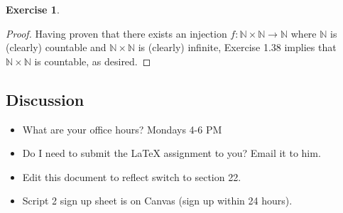 \documentclass[titlepage]{article}
\newcounter{script}
\theoremstyle{definition}
\newtheorem{exercise}{Exercise}[script]
\newcommand{\N}{\mathbb{N}}
\begin{document}
\begin{exercise}
\begin{proof}
        Having proven that there exists an injection $f:\N\times\N\to\N$ where $\N$ is (clearly) countable and $\N\times\N$ is (clearly) infinite, Exercise 1.38 implies that $\N\times\N$ is countable, as desired.
    \end{proof}
\end{exercise}


\subsection{Discussion}
\begin{itemize}
    \item {}What are your office hours? Mondays 4-6 PM
    \item Do I need to submit the LaTeX assignment to you? Email it to him.
    \item Edit this document to reflect switch to section 22.
    \item Script 2 sign up sheet is on Canvas (sign up within 24 hours).
\end{itemize}
\newpage



\setcounter{secnumdepth}{0}
\end{document}

